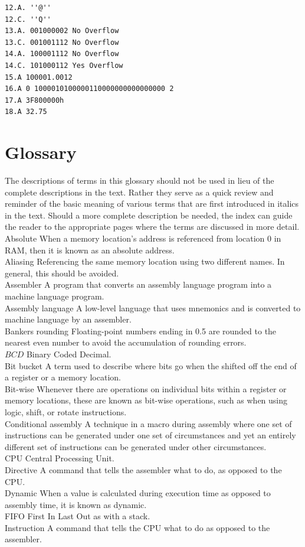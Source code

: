 \documentclass[10pt]{book}
\begin{document}
\begin{verbatim}
12.A. ''@''
12.C. ''Q''
13.A. 001000002 No Overflow
13.C. 001001112 No Overflow
14.A. 100001112 No Overflow
14.C. 101000112 Yes Overflow
15.A 100001.0012
16.A 0 1000010100000110000000000000000 2
17.A 3F800000h
18.A 32.75
\end{verbatim}

\section{Glossary}
The descriptions of terms in this glossary should not be used in lieu of the complete descriptions in the text. Rather they serve as a quick review and reminder of the basic meaning of various terms that are first introduced in italics in the text. Should a more complete description be needed, the index can guide the reader to the appropriate pages where the terms are discussed in more detail.
Absolute When a memory location's address is referenced from location 0 in RAM, then it is known as an absolute address.\\
Aliasing Referencing the same memory location using two different names. In general, this should be avoided.\\
Assembler A program that converts an assembly language program into a machine language program.\\
Assembly language A low-level language that uses mnemonics and is converted to machine language by an assembler.\\
Bankers rounding Floating-point numbers ending in 0.5 are rounded to the nearest even number to avoid the accumulation of rounding errors.\\
$B C D$ Binary Coded Decimal.\\
Bit bucket A term used to describe where bits go when the shifted off the end of a register or a memory location.\\
Bit-wise Whenever there are operations on individual bits within a register or memory locations, these are known as bit-wise operations, such as when using logic, shift, or rotate instructions.\\
Conditional assembly A technique in a macro during assembly where one set of instructions can be generated under one set of circumstances and yet an entirely different set of instructions can be generated under other circumstances.\\
CPU Central Processing Unit.\\
Directive A command that tells the assembler what to do, as opposed to the CPU.\\
Dynamic When a value is calculated during execution time as opposed to assembly time, it is known as dynamic.\\
FIFO First In Last Out as with a stack.\\
Instruction A command that tells the CPU what to do as opposed to the assembler.
\end{document}
